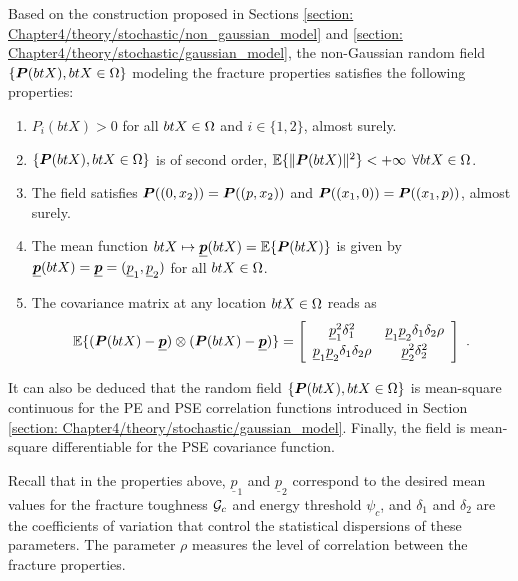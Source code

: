 Based on the construction proposed in Sections \ref{section: Chapter4/theory/stochastic/non_gaussian_model} and \ref{section: Chapter4/theory/stochastic/gaussian_model}, the non-Gaussian random field $\{\boldsymbol{P}(btX), btX \in \Omega\}$ modeling the fracture properties satisfies the following properties:
\begin{enumerate}
  \item $P_i(btX) > 0$ for all $btX \in \Omega$ and $i \in \{1,2\}$, almost surely.
  \item $\{\boldsymbol{P}(btX), btX \in \Omega\}$ is of second order, $\mathbb{E}\{\|\boldsymbol{P}(btX)\|^2\} < + \infty$ $\forall btX \in \Omega$.
  \item The field satisfies $\boldsymbol{P}((0, x_2)) = \boldsymbol{P}((p, x_2))$ and $\boldsymbol{P}((x_1, 0)) = \boldsymbol{P}((x_1, p))$, almost surely.
  \item The mean function $btX \mapsto \underline{\boldsymbol{p}}(btX) = \mathbb{E}\{\boldsymbol{P}(btX)\}$ is given by $\underline{\boldsymbol{p}}(btX) = \underline{\boldsymbol{p}} = (\underline{p}_1, \underline{p}_2)$ for all $btX \in \Omega$.
  \item The covariance matrix at any location $btX \in \Omega$ reads as
        \begin{align}
          \mathbb{E}\{(\boldsymbol{P}(btX) - \underline{\boldsymbol{p}}) \otimes (\boldsymbol{P}(btX) - \underline{\boldsymbol{p}})\} = \left[\begin{array}{cc} \underline{p}_1^2 \delta_1^2 &  \underline{p}_1 \underline{p}_2 \delta_1  \delta_2 \rho  \\[1mm] \underline{p}_1 \underline{p}_2 \delta_1  \delta_2 \rho & \underline{p}_2^2 \delta_2^2 \end{array}\right]~.
        \end{align}
\end{enumerate}
It can also be deduced that the random field $\{\boldsymbol{P}(btX), btX \in \Omega\}$ is mean-square continuous for the PE and PSE correlation functions introduced in Section \ref{section: Chapter4/theory/stochastic/gaussian_model}. Finally, the field is mean-square differentiable for the PSE covariance function.

Recall that in the properties above, $\underline{p}_1$ and $\underline{p}_2$ correspond to the desired mean values for the fracture toughness ${\mathcal{G}_c}$ and energy threshold $\psi_c$, and $\delta_1$ and $\delta_2$ are the coefficients of variation that control the statistical dispersions of these parameters. The parameter $\rho$ measures the level of correlation between the fracture properties.

